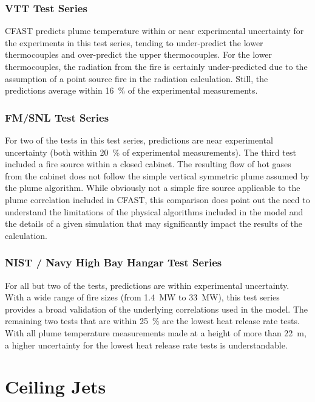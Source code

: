 \subsubsection{VTT Test Series}

CFAST predicts plume temperature within or near experimental uncertainty for the experiments in this test series, tending to under-predict the lower thermocouples and over-predict the upper thermocouples. For the lower thermocouples, the radiation from the fire is certainly under-predicted due to the assumption of a point source fire in the radiation calculation.	Still, the predictions average within 16~\% of the experimental measurements.

\subsubsection{FM/SNL Test Series}

For two of the tests in this test series, predictions are near experimental uncertainty (both within 20~\% of experimental measurements). The third test included a fire source within a closed cabinet.  The resulting flow of hot gases from the cabinet does not follow the simple vertical symmetric plume assumed by the plume algorithm.  While obviously not a simple fire source applicable to the plume correlation included in CFAST, this comparison does point out the need to understand the limitations of the physical algorithms included in the model and the details of a given simulation that may significantly impact the results of the calculation.

\subsubsection{NIST / Navy High Bay Hangar Test Series}

For all but two of the tests, predictions are within experimental uncertainty.  With a wide range of fire sizes (from 1.4~MW to 33~MW), this test series provides a broad validation of the underlying correlations used in the model.  The remaining two tests that are within 25~\% are the lowest heat release rate tests.  With all plume temperature measurements made at a height of more than 22~m, a higher uncertainty for the lowest heat release rate tests is understandable.

\section{Ceiling Jets}

